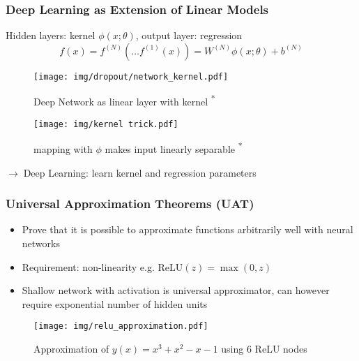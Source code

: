 \documentclass{beamer}
\newcommand{\arrow}{$\rightarrow\;$}
\newcommand{\relu}{\text{ReLU}}
\renewcommand{\k}[2]{#1^{(#2)}}
\begin{document}
\begin{frame}
    \frametitle{Deep Learning as Extension of Linear Models}
    Hidden layers: kernel $\phi(x; \theta)$, output layer: regression
    \begin{equation*}
        f(x) = \k{f}{N}(\ldots \k{f}{1}(x)) = \k{W}{N}\phi(x; \theta) + \k{b}{N}
    \end{equation*}
    
    \begin{minipage}[b]{0.49\textwidth}
        \begin{figure}
            \texttt{[image: img/dropout/network\_kernel.pdf]}
            \caption{Deep Network as linear layer with kernel \cite{dropout}\textsuperscript{*}}
        \end{figure}
    \end{minipage}
    \begin{minipage}[b]{0.49\textwidth}
        \begin{figure}
            \texttt{[image: img/kernel trick.pdf]}
            \caption{mapping with $\phi$ makes input linearly separable \cite{kernel}\textsuperscript{*}}
        \end{figure}
    \end{minipage}
    
    \arrow Deep Learning: learn kernel and regression parameters
\end{frame}

\begin{frame}
    \frametitle{Universal Approximation Theorems (UAT)}
    \begin{itemize}
        \item Prove that it is possible to approximate functions arbitrarily well with neural networks
        \item Requirement: non-linearity e.g. $\relu(z) = \max(0, z)$
        \item Shallow network with activation is universal approximator, can however require exponential number of hidden units %
    \end{itemize}    

    \begin{figure}
        \texttt{[image: img/relu\_approximation.pdf]}
        \caption{Approximation of $y(x) = x^3+x^2-x-1$ using 6 ReLU nodes}
    \end{figure}


\end{frame}
\end{document}
